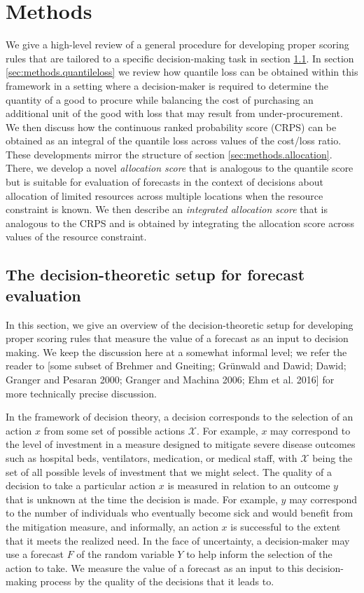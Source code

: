 \documentclass{article}
\begin{document}
\section{Methods}
\label{sec:methods}

We give a high-level review of a general procedure for developing proper scoring rules that are tailored to a specific decision-making task in section \ref{sec:methods.decisiontheory}. In section \ref{sec:methods.quantileloss} we review how quantile loss can be obtained within this framework in a setting where a decision-maker is required to determine the quantity of a good to procure while balancing the cost of purchasing an additional unit of the good with loss that may result from under-procurement. We then discuss how the continuous ranked probability score (CRPS) can be obtained as an integral of the quantile loss across values of the cost/loss ratio. These developments mirror the structure of section \ref{sec:methods.allocation}. There, we develop a novel \emph{allocation score} that is analogous to the quantile score but is suitable for evaluation of forecasts in the context of decisions about allocation of limited resources across multiple locations when the resource constraint is known. We then describe an \emph{integrated allocation score} that is analogous to the CRPS and is obtained by integrating the allocation score across values of the resource constraint.

\subsection{The decision-theoretic setup for forecast evaluation}
\label{sec:methods.decisiontheory}

In this section, we give an overview of the decision-theoretic setup for developing proper scoring rules that measure the value of a forecast as an input to decision making. We keep the discussion here at a somewhat informal level; we refer the reader to [some subset of Brehmer and Gneiting; Grünwald and Dawid; Dawid; Granger and Pesaran 2000; Granger and Machina 2006; Ehm et al. 2016] for more technically precise discussion.

In the framework of decision theory, a decision corresponds to the selection of an action $x$ from some set of possible actions $\mathcal{X}$. For example, $x$ may correspond to the level of investment in a measure designed to mitigate severe disease outcomes such as hospital beds, ventilators, medication, or medical staff, with $\mathcal{X}$ being the set of all possible levels of investment that we might select. The quality of a decision to take a particular action $x$ is measured in relation to an outcome $y$ that is unknown at the time the decision is made. For example, $y$ may correspond to the number of individuals who eventually become sick and would benefit from the mitigation measure, and informally, an action $x$ is successful to the extent that it meets the realized need. In the face of uncertainty, a decision-maker may use a forecast $F$ of the random variable $Y$ to help inform the selection of the action to take. We measure the value of a forecast as an input to this decision-making process by the quality of the decisions that it leads to.
\end{document}

